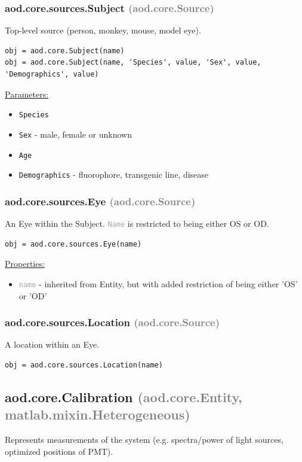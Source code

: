 \documentclass[10pt]{exam}
\newcommand\myparent[1]{\textcolor{gray}{(#1)}}
\newcommand\aodparam[1]{\textcolor{codepurple}{\texttt{#1}}}
\newcommand\aodclass[1]{\textcolor{codeblue}{\texttt{#1}}}
\newcommand\aodprop[1]{\textcolor{darkgray}{\texttt{#1}}}
\newcommand\docheader[1]{\vspace{0.6ex}\noindent\underline{#1}\vspace{0.15ex}}
\begin{document}
		\subsubsection{aod.core.sources.Subject \textcolor{gray}{(aod.core.Source)}}
			\noindent Top-level source (person, monkey, mouse, model eye).
			\begin{lstlisting}[style=matlab-editor, basicstyle=\mlttfamily\footnotesize]
obj = aod.core.Subject(name)
obj = aod.core.Subject(name, 'Species', value, 'Sex', value, 'Demographics', value)
			\end{lstlisting}
			\docheader{Parameters:}
			\begin{itemize}
				\item \aodparam{Species}
				\item \aodparam{Sex} - male, female or unknown
				\item \aodparam{Age}
				\item \aodparam{Demographics} - fluorophore, transgenic line, disease
			\end{itemize}
		\subsubsection{aod.core.sources.Eye \textcolor{gray}{(aod.core.Source)}}
			\noindent An Eye within the Subject. \aodprop{Name} is restricted to being either OS or OD.
			\begin{lstlisting}[style=matlab-editor, basicstyle=\mlttfamily\footnotesize]
obj = aod.core.sources.Eye(name)
			\end{lstlisting} 
			\docheader{Properties:}
			\begin{itemize}
				\item \aodprop{name} - inherited from Entity, but with added restriction of being either 'OS' or 'OD'
			\end{itemize}
			
		\subsubsection{aod.core.sources.Location  	\textcolor{gray}{(aod.core.Source)}}
			\noindent A location within an Eye.
			\begin{lstlisting}[style=matlab-editor, basicstyle=\mlttfamily\footnotesize]
obj = aod.core.sources.Location(name)
			\end{lstlisting}
	
	\subsection{aod.core.Calibration \myparent{aod.core.Entity, matlab.mixin.Heterogeneous}}
		\label{subsection:CalibrationDoc}
		\noindent Represents measurements of the system (e.g. spectra/power of light sources, optimized positions of PMT). %
	
\end{document}
